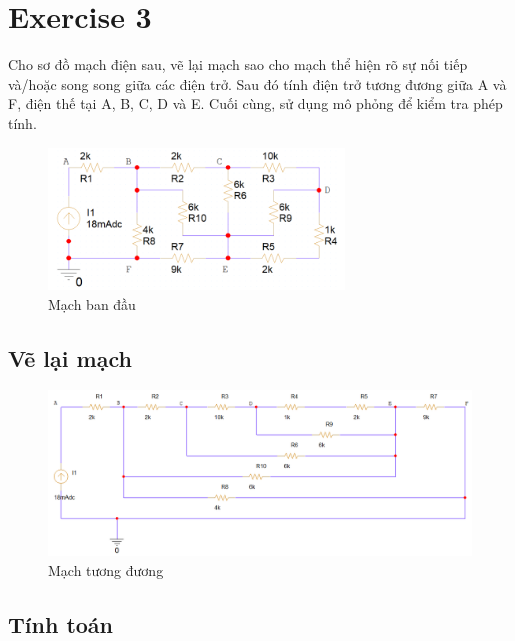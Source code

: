 \section{Exercise 3}
Cho sơ đồ mạch điện sau, vẽ lại mạch sao cho mạch thể hiện rõ sự nối tiếp và/hoặc song song giữa các điện trở. Sau đó tính điện trở tương đương giữa A và F, điện thế tại A, B, C, D và E. Cuối cùng, sử dụng mô phỏng để kiểm tra phép tính.
\begin{figure}[!htbp]
    \centering
    \includegraphics[width=0.7\textwidth]{graphics/ex3/f2.PNG}
    \caption{Mạch ban đầu}
\end{figure}

\subsection{Vẽ lại mạch}

\begin{figure}[!htbp]
    \centering
    \includegraphics[width=1\textwidth]{graphics/ex3/f1.PNG}
    \caption{Mạch tương đương}
\end{figure}

\pagebreak

\subsection{Tính toán}

